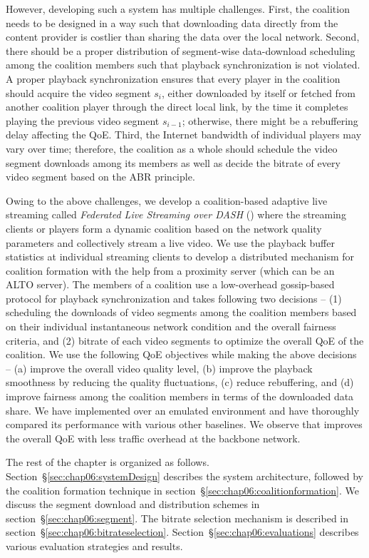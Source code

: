 However, developing such a system has multiple challenges. First, the coalition needs to be designed in a way such that downloading data directly from the content provider is costlier than sharing the data over the local network. Second, there should be a proper distribution of segment-wise data-download scheduling among the coalition members such that playback synchronization is not violated. A proper playback synchronization ensures that every player in the coalition should acquire the video segment $s_{i}$, either downloaded by itself or fetched from another coalition player through the direct local link, by the time it completes playing the previous video segment $s_{i-1}$; otherwise, there might be a rebuffering delay affecting the \ac{QoE}. Third, the Internet bandwidth of individual players may vary over time; therefore, the coalition as a whole should schedule the video segment downloads among its members as well as decide the bitrate of every video segment based on the \ac{ABR} principle.

Owing to the above challenges, we develop a coalition-based adaptive live streaming  called \textit{Federated Live Streaming over \ac{DASH}} (\our) where the streaming clients or players form a dynamic coalition based on the network quality parameters and collectively stream a live video. We use the playback buffer statistics at individual streaming clients to develop a distributed mechanism for coalition formation with the help from a proximity server (which can be an \ac{ALTO} server). The members of a coalition use a low-overhead gossip-based protocol for playback synchronization and takes following two decisions -- (1) scheduling the downloads of video segments among the coalition members based on their individual instantaneous network condition and the overall fairness criteria, and (2) bitrate of each video segments to optimize the overall \ac{QoE} of the coalition. We use the following \ac{QoE} objectives while making the above decisions -- (a) improve the overall video quality level, (b) improve the playback smoothness by reducing the quality fluctuations, (c) reduce rebuffering, and (d) improve fairness  among the coalition members in terms of the downloaded data share. We have implemented {\our} over an emulated environment and have thoroughly compared its performance with various other baselines. We observe that {\our} improves the overall \ac{QoE} with less traffic overhead at the backbone network.

The rest of the chapter is organized as follows. Section~\S\ref{sec:chap06:systemDesign} describes the system architecture, followed by the coalition formation technique in section~\S\ref{sec:chap06:coalitionformation}. We discuss the segment download and distribution schemes in section~\S\ref{sec:chap06:segment}. The bitrate selection mechanism is described in section~\S\ref{sec:chap06:bitrateselection}. Section~\S\ref{sec:chap06:evaluations} describes various evaluation strategies and results.
